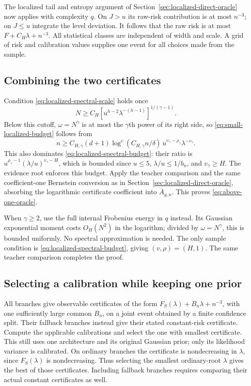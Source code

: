The localized tail and entropy argument of Section~\ref{sec:localized-direct-oracle} now applies with complexity $q$. On $J>u$ its raw-risk contribution is at most $n^{-3}$; on $J\le u$ integrate the level deviation. It follows that the raw risk is at most $F+C_H\lambda+n^{-3}$. All statistical classes are independent of width and scale. A grid of risk and calibration values supplies one event for all choices made from the sample.

\subsection{Combining the two certificates}
Condition \eqref{eq:localized-spectral-scale} holds once
\[
 N\ge C_H[u^{h-2}\lambda^{-(h-1)}]^{1/(\gamma-1)}.
\]
Below this cutoff, $\omega=N^\gamma$ is at most the $\gamma$th power of its right side, so \eqref{eq:small-localized-budget} follows from
\[
 n\ge C_{H,\gamma}(d+1)\log^c(C_{H,\gamma}n/\delta)\,
                   u^{v_\gamma-\rho_\gamma}\lambda^{-v_\gamma}.
\]
This also dominates \eqref{eq:localized-spectral-budget}: their ratio is
$u^{\rho_\gamma-1}(\lambda/u)^{v_\gamma-H}$, which is bounded since $u\le5$, $\lambda/u\le1/b_n$, and $v_\gamma\ge H$.
The evidence root enforces this budget. Apply the teacher comparison and the same coefficient-one Bernstein conversion as in Section~\ref{sec:localized-direct-oracle}, absorbing the logarithmic certificate coefficient into $\overline A_{g,n}$. This proves \eqref{eq:above-one-oracle}.

When $\gamma\ge2$, use the full internal Frobenius energy in $q$ instead. Its Gaussian exponential moment costs $O_H(N^2)$ in the logarithm; divided by $\omega=N^\gamma$, this is bounded uniformly. No spectral approximation is needed. The only sample condition is \eqref{eq:localized-spectral-budget}, giving $(v,\rho)=(H,1)$. The same teacher comparison completes the proof.

\subsection{Selecting a calibration while keeping one prior}
All branches give observable certificates of the form $F_S(\lambda)+B_n\lambda+n^{-3}$, with one sufficiently large common $B_n$, on a joint event obtained by a finite confidence split. Their fallback branches instead give their stated constant-risk certificate. Compute the applicable calibrations and select the one with smallest certificate. This still uses one architecture and its original Gaussian prior; only its likelihood variance is calibrated. On ordinary branches the certificate is nondecreasing in $\lambda$, since $F_S(\lambda)$ is nondecreasing. Thus selecting the smallest ordinary-root $\lambda$ gives the best of those certificates. Including fallback branches requires comparing their actual constant certificates as well.

